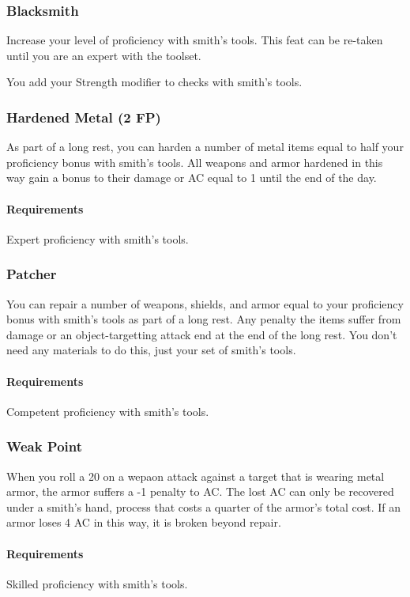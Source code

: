     \subsubsection{Blacksmith} \label{feat::blacksmith}
        Increase your level of proficiency with smith's tools.
        This feat can be re-taken until you are an expert with the toolset.

        You add your Strength modifier to checks with smith's tools.
    \subsubsection{Hardened Metal (2 FP)} \label{feat::hardenedmetal}
        As part of a long rest, you can harden a number of metal items equal to half your proficiency bonus with smith's tools.
        All weapons and armor hardened in this way gain a bonus to their damage or AC equal to 1 until the end of the day.
        \paragraph{Requirements} Expert proficiency with smith's tools.
    \subsubsection{Patcher} \label{feat::patcher}
        You can repair a number of weapons, shields, and armor equal to your proficiency bonus with smith's tools as part of a long rest.
        Any penalty the items suffer from damage or an object-targetting attack end at the end of the long rest.
        You don't need any materials to do this, just your set of smith's tools.
        \paragraph{Requirements} Competent proficiency with smith's tools.
    \subsubsection{Weak Point} \label{feat::weakpoint}
        When you roll a 20 on a wepaon attack against a target that is wearing metal armor, the armor suffers a -1 penalty to AC.
        The lost AC can only be recovered under a smith's hand, process that costs a quarter of the armor's total cost.
        If an armor loses 4 AC in this way, it is broken beyond repair.
        \paragraph{Requirements} Skilled proficiency with smith's tools.
